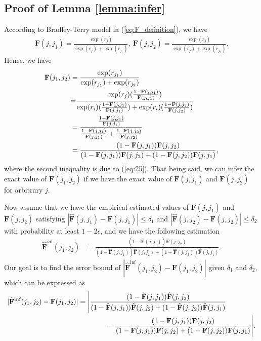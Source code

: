 \documentclass{article} %
\def\eqref#1{equation~\ref{#1}}
\newcommand{\bF}{\mathbf{F}}
\renewcommand{\eqref}[1]{(\ref{#1})}
\begin{document}
{\subsection{Proof of Lemma \ref{lemma:infer}}

According to Bradley-Terry model in \eqref{eq:F_definition}, we have 
\begin{align}\label{eq:25}
    \bF(j, j_1)=\frac{\exp(r_j)}{\exp(r_j)+\exp(r_{j_1})}, ~\bF(j, j_2)=\frac{\exp(r_j)}{\exp(r_j)+\exp(r_{j_2})}.
\end{align}
Hence, we have
\begin{align}
    \bF(j_1, j_2)&=\frac{\exp(r_{j_1})}{\exp(r_{j_1})+\exp(r_{j_2})}\nonumber\allowdisplaybreaks\\
    &{=}\frac{\exp(r_j)(\frac{1-\bF(j,j_1)}{\bF(j,j_1)})}{\exp(r_i)(\frac{1-\bF(j,j_1)}{\bF(j,j_1)})+\exp(r_i)(\frac{1-\bF(j,j_2)}{\bF(j,j_2)})}\nonumber\allowdisplaybreaks\\
    &=\frac{\frac{1-\bF(j,j_1)}{\bF(j,j_1)}}{\frac{1-\bF(j,j_1)}{\bF(j,j_1)}+\frac{1-\bF(j,j_2)}{\bF(j,j_2)}}\nonumber\allowdisplaybreaks\\
    &=\frac{(1-\bF(j,j_1))\bF(j,j_2)}{(1-\bF(j,j_1))\bF(j,j_2)+(1-\bF(j,j_2))\bF(j,j_1)},
\end{align}
where the second inequality is due to \eqref{eq:25}.
That being said, we can infer the exact value of $\bF(j_1, j_2)$ if we have the exact value of $\bF(j, j_1)$ and $\bF(j, j_2)$ for arbitrary $j$.

Now assume that we have the empirical estimated values of $\bF(j, j_1)$ and $\bF(j, j_2)$ satisfying  $|\hat{\bF}(j, j_1)-\bF(j, j_1)|\leq \delta_1$ and $|\hat{\bF}(j, j_2)-\bF(j, j_2)|\leq \delta_2$ with probability at least $1-2\epsilon$, and we have the following estimation 
\begin{align}
    \hat{\bF}^{\text{inf}}(j_1, j_2)
    &=\frac{(1-\hat{\bF}(j,j_1))\hat{\bF}(j,j_2)}{(1-\hat{\bF}(j,j_1))\hat{\bF}(j,j_2)+(1-\hat{\bF}(j,j_2))\hat{\bF}(j,j_1)}.
\end{align}
Our goal is to find the error bound of $|\hat{\bF}^{\text{inf}}(j_1, j_2)-\bF(j_1, j_2)|$ given $\delta_1$ and $\delta_2$, which can be expressed as 
\begin{align}\label{eq:28}
  |\hat{\bF}^{\text{inf}}(j_1, j_2)-\bF(j_1, j_2)|&=\Bigg|\frac{(1-\hat{\bF}(j,j_1))\hat{\bF}(j,j_2)}{(1-\hat{\bF}(j,j_1))\hat{\bF}(j,j_2)+(1-\hat{\bF}(j,j_2))\hat{\bF}(j,j_1)}\nonumber\allowdisplaybreaks\\
  &\qquad\qquad-\frac{(1-\bF(j,j_1))\bF(j,j_2)}{(1-\bF(j,j_1))\bF(j,j_2)+(1-\bF(j,j_2))\bF(j,j_1)}\Bigg|.  
\end{align}

}
\end{document}
